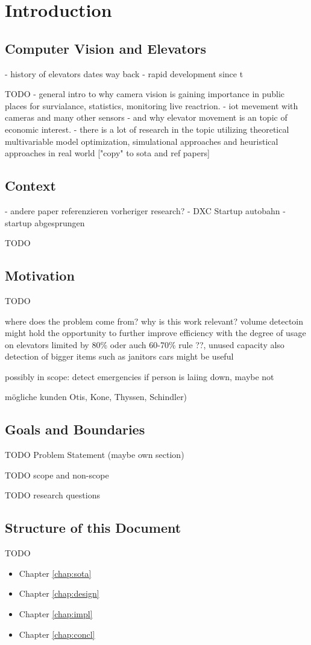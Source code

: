 \chapter{Introduction}
\label{chap:intro}

\section{Computer Vision and Elevators}

- history of elevators dates way back
- rapid development since t

TODO
- general intro to why camera vision is gaining importance in public places for survialance, statistics, monitoring live reactrion. 
- iot mevement with cameras and many other sensors
- and why elevator movement is an topic of economic interest.
- there is a lot of research in the topic utilizing theoretical multivariable model optimization, simulational approaches and heuristical approaches in real world ["copy" to sota and ref papers]


\section{Context}

- andere paper referenzieren vorheriger research?
- DXC Startup autobahn 
- startup abgesprungen

TODO

\section{Motivation}


TODO

where does the problem come from?
why is this work relevant?
volume detectoin might hold the opportunity to further improve efficiency with the degree of usage on elevators
limited by 80\% oder auch 60-70\% rule ??, unused capacity
also detection of bigger items such as janitors cars might be useful

possibly in scope: detect emergencies if person is laiing down, maybe not

mögliche kunden Otis, Kone, Thyssen, Schindler)

\section{Goals and Boundaries}

TODO Problem Statement (maybe own section)

TODO scope and non-scope

TODO research questions

\section{Structure of this Document}

TODO

\begin{itemize}
    \item Chapter \ref{chap:sota}
    \item Chapter \ref{chap:design}
    \item Chapter \ref{chap:impl}
    \item Chapter \ref{chap:concl}
\end{itemize}